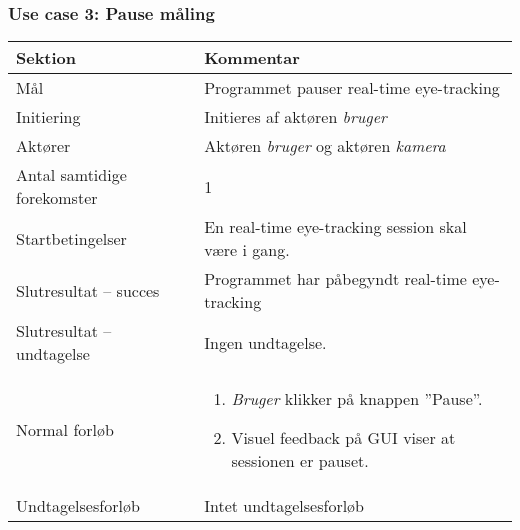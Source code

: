 \documentclass[kravspec.tex]{subfiles}
\begin{document}
	\subsubsection{Use case 3: Pause måling}
	\begin{tabular}{|l|p{7.7cm}|}
		\hline \textbf{Sektion} 	& \textbf{Kommentar} \\ 
		\hline Mål  & Programmet pauser real-time eye-tracking \\ 
		\hline Initiering  & Initieres af aktøren \textit{bruger} \\ 
		\hline Aktører & Aktøren \textit{bruger} og aktøren \textit{kamera} \\ 
		\hline Antal samtidige forekomster & 1 \\ 
		\hline Startbetingelser & En real-time eye-tracking session skal være i gang.   \\ 
		\hline Slutresultat – succes & Programmet har påbegyndt real-time eye-tracking \\ 
		\hline Slutresultat – undtagelse & Ingen undtagelse. \\ 
		\hline Normal forløb & \begin{enumerate}
			\item \textit{Bruger} klikker på knappen ”Pause”.
			\item Visuel feedback på GUI viser at sessionen er pauset.
		\end{enumerate} \\ 
		\hline Undtagelsesforløb & Intet undtagelsesforløb \\ 
		\hline 
	\end{tabular}
	
\end{document}

